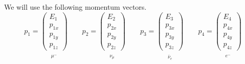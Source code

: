 \documentclass[12pt]{article}
\begin{document}
\noindent
We will use the following momentum vectors.
\begin{equation*}
p_1=
\underset{\substack{\\[1ex] \mu^-}}
{\begin{pmatrix}E_1\\p_{1x}\\p_{1y}\\p_{1z}\end{pmatrix}}
\qquad
p_2=
\underset{\substack{\\[1ex] \nu_\mu}}
{\begin{pmatrix}E_2\\p_{2x}\\p_{2y}\\p_{2z}\end{pmatrix}}
\qquad
p_3=
\underset{\substack{\\[1ex] \bar{\nu}_e}}
{\begin{pmatrix}E_3\\p_{3x}\\p_{3y}\\p_{3z}\end{pmatrix}}
\qquad
p_4=
\underset{\substack{\\[1ex] e^-}}
{\begin{pmatrix}E_4\\p_{4x}\\p_{4y}\\p_{4z}\end{pmatrix}}
\end{equation*}
\end{document}
